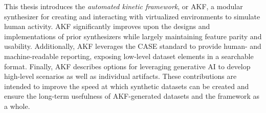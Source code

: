 This thesis introduces the \emph{\emph{automated kinetic framework}}, or
AKF, a modular synthesizer for creating and interacting with virtualized
environments to simulate human activity. AKF significantly improves upon
the designs and implementations of prior synthesizers while largely
maintaining feature parity and usability. Additionally, AKF leverages
the CASE standard to provide human- and machine-readable reporting,
exposing low-level dataset elements in a searchable format. Finally, AKF
describes options for leveraging generative AI to develop high-level
scenarios as well as individual artifacts. These contributions are
intended to improve the speed at which synthetic datasets can be created
and ensure the long-term usefulness of AKF-generated datasets and the
framework as a whole.
